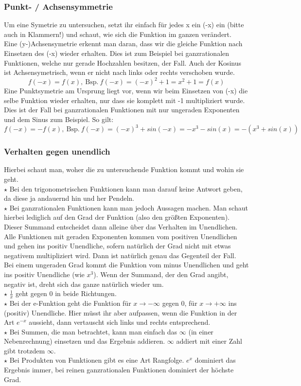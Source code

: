 \subsubsection{Punkt- / Achsensymmetrie}
Um eine Symetrie zu untersuchen, setzt ihr einfach für jedes x ein (-x) ein (bitte auch in Klammern!) und schaut, wie sich die Funktion im ganzen verändert.\\
Eine (y-)Achsensymetrie erkennt man daran, dass wir die gleiche Funktion nach Einsetzen des (-x) wieder erhalten. Dies ist zum Beispiel bei ganzrationalen Funktionen, welche nur gerade Hochzahlen besitzen, der Fall. Auch der Kosinus ist Achsensymetrisch, wenn er nicht nach links oder rechts verschoben wurde.
\[f(-x)=f(x),\mathrm{\ Bsp.\ } f(-x)=(-x)^2+1=x^2+1=f(x)\]
Eine Punktsymetrie am Ursprung liegt vor, wenn wir beim Einsetzen von (-x) die selbe Funktion wieder erhalten, nur dass sie komplett mit -1 multipliziert wurde. Dies ist der Fall bei ganzrationalen Funktionen mit nur ungeraden Exponenten und dem Sinus zum Beispiel. So gilt:
\[f(-x)=-f(x),\mathrm{\ Bsp.\ } f(-x)=(-x)^3+sin(-x)=-x^3-sin(x)=-(x^3+sin(x))\]
\subsubsection{Verhalten gegen unendlich}
Hierbei schaut man, woher die zu untersuchende Funktion kommt und wohin sie geht.\\
\(\star\) Bei den trigonometrischen Funktionen kann man darauf keine Antwort geben, da diese ja andauernd hin und her Pendeln.\\
\(\star\) Bei ganzrationalen Funktionen kann man jedoch Aussagen machen. Man schaut hierbei lediglich auf den Grad der Funktion (also den größten Exponenten). Dieser Summand entscheidet dann alleine über das Verhalten im Unendlichen. Alle Funktionen mit geraden Exponenten kommen vom positiven Unendlichen und gehen ins positiv Unendliche, sofern natürlich der Grad nicht mit etwas negativem multipliziert wird. Dann ist natürlich genau das Gegenteil der Fall.\\
Bei einem ungeraden Grad kommt die Funktion vom minus Unendlichen und geht ins positiv Unendliche (wie \(x^3\)). Wenn der Summand, der den Grad angibt, negativ ist, dreht sich das ganze natürlich wieder um.\\
\(\star\) \(\frac{1}{x}\) geht gegen 0 in beide Richtungen.\\
\(\star\) Bei der e-Funktion geht die Funktion für \(x\rightarrow -\infty\) gegen 0, für \(x\rightarrow + \infty\) ins (positiv) Unendliche. Hier müsst ihr aber aufpassen, wenn die Funktion in der Art \(e^{-x}\) aussieht, dann vertauscht sich links und rechts entsprechend.\\
\(\star\) Bei Summen, die man betrachtet, kann man einfach das \(\infty\) (in einer Nebenrechnung) einsetzen und das Ergebnis addieren. \(\infty\) addiert mit einer Zahl gibt trotzdem \(\infty\).\\
\(\star\) Bei Produkten von Funktionen gibt es eine Art Rangfolge. \(e^x\) dominiert das Ergebnis immer, bei reinen ganzrationalen Funktionen dominiert der höchste Grad.

